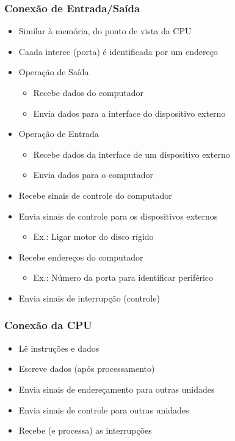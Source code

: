\documentclass[12pt]{article}
\begin{document}
        \subsubsection{Conexão de Entrada/Saída}
        \begin{itemize}
            \item Similar à memória, do ponto de vista da CPU
            \item Caada interce (porta) é identificada por um endereço
            \item Operação de Saída
            \begin{itemize}
                \item Recebe dados do computador
                \item Envia dados para a interface do dispositivo externo
            \end{itemize}
            \item Operação de Entrada
            \begin{itemize}
                \item Recebe dados da interface de um dispositivo externo
                \item Envia dados para o computador
            \end{itemize}
            \item Recebe sinais de controle do computador
            \item Envia sinais de controle para os dispositivos externos
            \begin{itemize}
                \item Ex.: Ligar motor do disco rígido
            \end{itemize}
            \item Recebe endereços do computador
            \begin{itemize}
                \item Ex.: Número da porta para identificar periférico
            \end{itemize}
            \item Envia sinais de interrupção (controle)
        \end{itemize}
        \subsubsection{Conexão da CPU}
        \begin{itemize}
            \item Lê instruções e dados
            \item Escreve dados (após processamento)
            \item Envia sinais de endereçamento para outras unidades
            \item Envia sinais de controle para outras unidades
            \item Recebe (e processa) as interrupções
        \end{itemize}
\end{document}
